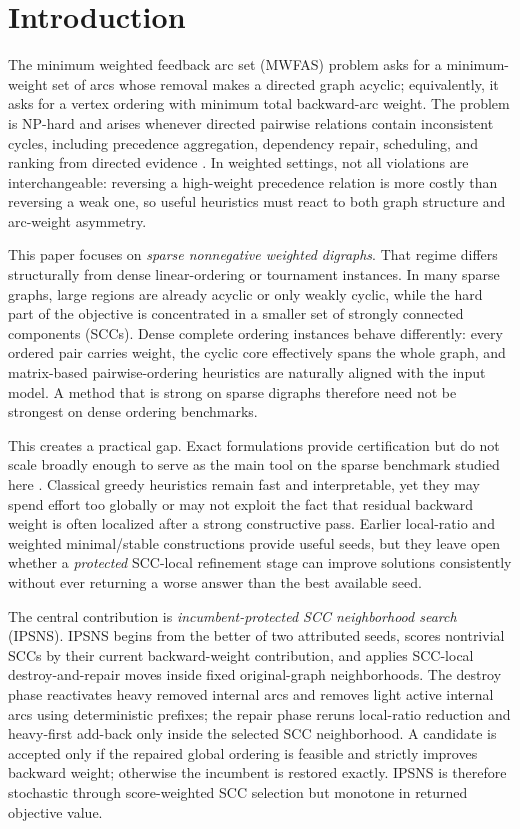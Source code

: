 \section{Introduction}
\label{sec:introduction}

The minimum weighted feedback arc set (MWFAS) problem asks for a minimum-weight set of arcs whose removal makes a directed graph acyclic; equivalently, it asks for a vertex ordering with minimum total backward-arc weight. The problem is NP-hard \cite{K72} and arises whenever directed pairwise relations contain inconsistent cycles, including precedence aggregation, dependency repair, scheduling, and ranking from directed evidence \cite{F90,ACN08}. In weighted settings, not all violations are interchangeable: reversing a high-weight precedence relation is more costly than reversing a weak one, so useful heuristics must react to both graph structure and arc-weight asymmetry.

This paper focuses on \emph{sparse nonnegative weighted digraphs}. That regime differs structurally from dense linear-ordering or tournament instances. In many sparse graphs, large regions are already acyclic or only weakly cyclic, while the hard part of the objective is concentrated in a smaller set of strongly connected components (SCCs). Dense complete ordering instances behave differently: every ordered pair carries weight, the cyclic core effectively spans the whole graph, and matrix-based pairwise-ordering heuristics are naturally aligned with the input model. A method that is strong on sparse digraphs therefore need not be strongest on dense ordering benchmarks.

This creates a practical gap. Exact formulations provide certification but do not scale broadly enough to serve as the main tool on the sparse benchmark studied here \cite{BSNA21}. Classical greedy heuristics remain fast and interpretable, yet they may spend effort too globally or may not exploit the fact that residual backward weight is often localized after a strong constructive pass. Earlier local-ratio and weighted minimal/stable constructions provide useful seeds, but they leave open whether a \emph{protected} SCC-local refinement stage can improve solutions consistently without ever returning a worse answer than the best available seed.

The central contribution is \emph{incumbent-protected SCC neighborhood search} (IPSNS). IPSNS begins from the better of two attributed seeds, scores nontrivial SCCs by their current backward-weight contribution, and applies SCC-local destroy-and-repair moves inside fixed original-graph neighborhoods. The destroy phase reactivates heavy removed internal arcs and removes light active internal arcs using deterministic prefixes; the repair phase reruns local-ratio reduction and heavy-first add-back only inside the selected SCC neighborhood. A candidate is accepted only if the repaired global ordering is feasible and strictly improves backward weight; otherwise the incumbent is restored exactly. IPSNS is therefore stochastic through score-weighted SCC selection but monotone in returned objective value.

